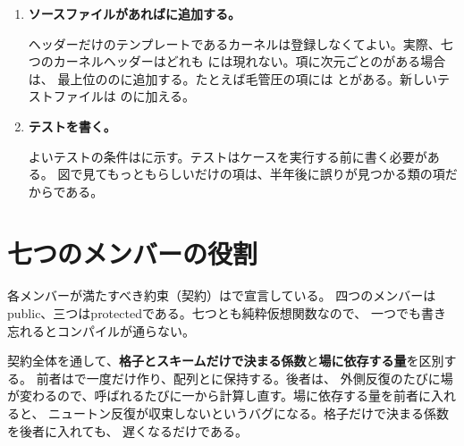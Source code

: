 \begin{enumerate}
\item \textbf{ソースファイルがあればに追加する。}

ヘッダーだけのテンプレートであるカーネルは登録しなくてよい。実際、七つのカーネルヘッダーはどれも
には現れない。項に次元ごとのがある場合は、
最上位ののに追加する。たとえば毛管圧の項には
とがある。新しいテストファイルは
のに加える。

\item \textbf{テストを書く。}

よいテストの条件はに示す。テストはケースを実行する前に書く必要がある。
図で見てもっともらしいだけの項は、半年後に誤りが見つかる類の項だからである。

\end{enumerate}

\section{七つのメンバーの役割}
\label{sec:extending:contract}

各メンバーが満たすべき約束（契約）はで宣言している。
四つのメンバーはpublic、三つはprotectedである。七つとも純粋仮想関数なので、
一つでも書き忘れるとコンパイルが通らない。

契約全体を通して、\textbf{格子とスキームだけで決まる係数}と\textbf{場に依存する量}を区別する。
前者はで一度だけ作り、配列とに保持する。後者は、
外側反復のたびに場が変わるので、呼ばれるたびに一から計算し直す。場に依存する量を前者に入れると、
ニュートン反復が収束しないというバグになる。格子だけで決まる係数を後者に入れても、
遅くなるだけである。

